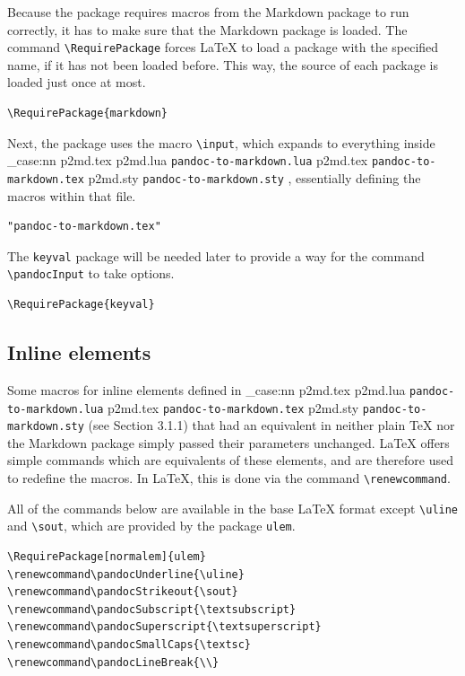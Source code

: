 \documentclass[
  digital,     %
  oneside,     %
  nosansbold,  %
  nocolorbold, %
  lof,         %
  nolot,       %
]{fithesis4}
\newcommand\macro[1]{\texttt{\textbackslash{}{#1}}}
\newcommand\file[1]
  {
    \str_case:nn
      { #1 }
      {
        { p2md.lua } { \texttt{pandoc\hyp{}to\hyp{}markdown.lua} }
        { p2md.tex } { \texttt{pandoc\hyp{}to\hyp{}markdown.tex} }
        { p2md.sty } { \texttt{pandoc\hyp{}to\hyp{}markdown.sty} }
      }
  }
\begin{document}
\noindent
Because the package requires macros from the Markdown package to run correctly, it has to make sure that the Markdown package is loaded. The command \macro{RequirePackage} forces \LaTeX{} to load a package with the specified name, if it has not been loaded before. This way, the source of each package is loaded just once at most.

\noindent
\lstset{language=[LaTeX]TeX}
\begin{lstlisting}
\RequirePackage{markdown}
\end{lstlisting}

\noindent
Next, the package uses the macro \macro{input}, which expands to everything inside \file{p2md.tex}, essentially defining the macros within that file.

\noindent
\lstset{language=[LaTeX]TeX}
\begin{lstlisting}
"pandoc-to-markdown.tex"
\end{lstlisting}

\noindent
The \texttt{keyval} package will be needed later to provide a way for the command \macro{pandocInput} to take options.

\noindent
\lstset{language=[LaTeX]TeX}
\begin{lstlisting}
\RequirePackage{keyval}
\end{lstlisting}

\subsection{Inline elements}
Some macros for inline elements defined in \file{p2md.tex} (see Section 3.1.1) that had an equivalent in neither plain \TeX{} nor the Markdown package simply passed their parameters unchanged. \LaTeX{} offers simple commands which are equivalents of these elements, and are therefore used to redefine the macros. In \LaTeX{}, this is done via the command \macro{renewcommand}.

All of the commands below are available in the base \LaTeX{} format except \macro{uline} and \macro{sout}, which are provided by the package \texttt{ulem}.

\noindent
\lstset{language=[LaTeX]TeX}
\begin{lstlisting}
\RequirePackage[normalem]{ulem}
\renewcommand\pandocUnderline{\uline}
\renewcommand\pandocStrikeout{\sout}
\renewcommand\pandocSubscript{\textsubscript}
\renewcommand\pandocSuperscript{\textsuperscript}
\renewcommand\pandocSmallCaps{\textsc}
\renewcommand\pandocLineBreak{\\}
\end{lstlisting}
\end{document}
